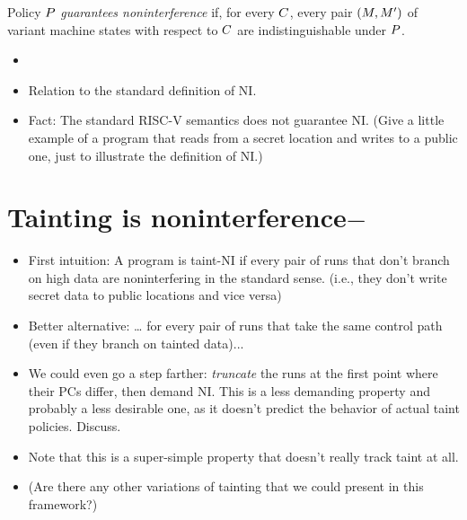 \documentclass[conference]{IEEEtran}
\begin{document}

Policy $P$ {\em guarantees noninterference} if, for every $C$,
every pair $(M,M')$ of variant machine states with respect to
$C$ are indistinguishable under $P$.

\iftext
\begin{itemize}
\item {}

\item Relation to the standard definition of NI.

\item Fact: The standard RISC-V semantics does not guarantee NI.  (Give a
little example of a program that reads from a secret location and writes to
a public one, just to illustrate the definition of NI.)
\end{itemize}
\fi

\section{Tainting is noninterference$-$}


\begin{itemize}
\item First intuition: A program is taint-NI if every pair of runs that don’t
branch on high data are noninterfering in the standard sense.  (i.e., they
don't write secret data to public locations and vice versa)
\item Better alternative: … for every pair of runs that take the same control path (even if they branch on tainted data)...
\item We could even go a step farther: {\em truncate} the runs at the
  first point where their PCs differ, then demand NI.  This is a less
  demanding property and probably a less desirable one, as it doesn't
  predict the behavior of actual taint policies.  Discuss.
\item Note that this is a super-simple property that doesn't really track
taint at all.
\item (Are there any other variations of tainting that we could present in
this framework?)
\end{itemize}
\end{document}
